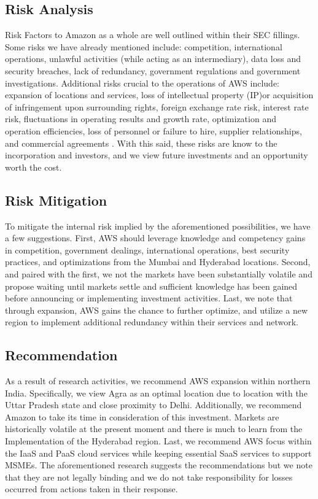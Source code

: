 \documentclass[a4paper, 12pt]{article}
\begin{document}
\subsection{Risk Analysis}
Risk Factors to Amazon as a whole are well outlined within their SEC fillings.
Some risks we have already mentioned include: competition, international operations, unlawful activities (while acting as an intermediary), data loss and security breaches, lack of redundancy, government regulations and government investigations.
Additional risks crucial to the operations of AWS include: expansion of locations and services, loss of intellectual property (IP)or acquisition of infringement upon surrounding rights, foreign exchange rate risk, interest rate risk, fluctuations in operating results and growth rate, optimization and operation efficiencies, loss of personnel or failure to hire, supplier relationships, and commercial agreements \cite[p.~6, 8-11]{AMZN_10K_2021}.
With this said, these risks are know to the incorporation and investors, and we view future investments and an opportunity worth the cost.

\subsection{Risk Mitigation}
To mitigate the internal risk implied by the aforementioned possibilities, we have a few suggestions.
First, AWS should leverage knowledge and competency gains in competition, government dealings, international operations, best security practices, and optimizations from the Mumbai and Hyderabad locations.
Second, and paired with the first, we not the markets have been substantially volatile and propose waiting until markets settle and sufficient knowledge has been gained before announcing or implementing investment activities.
Last, we note that through expansion, AWS gains the chance to further optimize, and utilize a new region to implement additional redundancy within their services and network.

\subsection{Recommendation}
As a result of research activities, we recommend AWS expansion within northern India.
Specifically, we view Agra as an optimal location due to location with the Uttar Pradesh state and close proximity to Delhi.
Additionally, we recommend Amazon to take its time in consideration of this investment.
Markets are historically volatile at the present moment and there is much to learn from the Implementation of the Hyderabad region.
Last, we recommend AWS focus within the IaaS and PaaS cloud services while keeping essential SaaS services to support MSMEs.
The aforementioned research suggests the recommendations but we note that they are not legally binding and we do not take responsibility for losses occurred from actions taken in their response.
\end{document}
